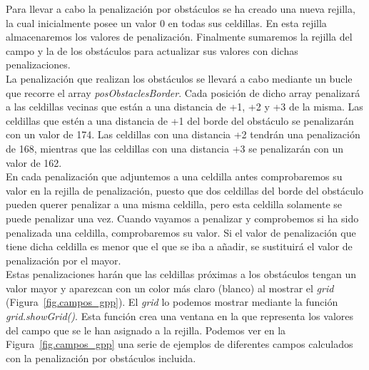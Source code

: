 Para llevar a cabo la penalización por obstáculos se ha creado una nueva rejilla, la cual inicialmente posee un valor 0 en todas sus celdillas. En esta rejilla almacenaremos los valores de penalización. Finalmente sumaremos la rejilla del campo y la de los obstáculos para actualizar sus valores con dichas penalizaciones.\\

La penalización que realizan los obstáculos se llevará a cabo mediante un bucle que recorre el array \textit{posObstaclesBorder}. Cada posición de dicho array penalizará a las celdillas vecinas que están a una distancia de +1, +2 y +3 de la misma. Las celdillas que estén a una distancia de +1 del borde del obstáculo se penalizarán con un valor de 174. Las celdillas con una distancia +2 tendrán una penalización de 168, mientras que las celdillas con una distancia +3 se penalizarán con un valor de 162.\\

En cada penalización que adjuntemos a una celdilla antes comprobaremos su valor en la rejilla de penalización, puesto que dos celdillas del borde del obstáculo pueden querer penalizar a una misma celdilla, pero esta celdilla solamente se puede penalizar una vez. Cuando vayamos a penalizar y comprobemos si ha sido penalizada una celdilla, comprobaremos su valor. Si el valor de penalización que tiene dicha celdilla es menor que el que se iba a añadir, se sustituirá el valor de penalización por el mayor.\\

Estas penalizaciones harán que las celdillas próximas a los obstáculos tengan un valor mayor y aparezcan con un color más claro (blanco) al mostrar el \textit{grid} (Figura~\ref{fig.campos_gpp}). El \textit{grid} lo podemos mostrar mediante la función \textit{grid.showGrid()}. Esta función crea una ventana en la que representa los valores del campo que se le han asignado a la rejilla. Podemos ver en la Figura~\ref{fig.campos_gpp} una serie de ejemplos de diferentes campos calculados con la penalización por obstáculos incluida.\\

